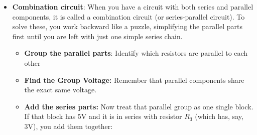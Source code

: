 \documentclass{report}
\begin{document}
\begin{itemize}
            \begin{itemize}
                \item \textbf{Identical Current (I):} The current flowing through every single series component is exactly the same (\(I_{total} = I_1 = I_2 = I_3\)). There are no alternate routes or branches, so current cannot split up.
                \item \textbf{Shared Voltage (V):} The total voltage from the power source is split across the components (\(V_{total} = V_1 + V_2 + V_3\)). Components with higher resistance will take a larger share of the voltage.
                \item \textbf{Cumulative Resistance (R):} The total resistance of the circuit is simply the sum of all individual resistances (\(R_{total} = R_1 + R_2 + R_3\)). Adding more resistors in series increases the total resistance and decreases the overall current.Dependent Operation: Because there is only one path, if any single component burns out, breaks, or is disconnected, the entire circuit is broken and all components stop working. (This is why one broken bulb on an old string of Christmas lights turns off the whole strand).
                \item \textbf{Dependent Operation:} Because there is only one path, if any single component burns out, breaks, or is disconnected, the entire circuit is broken and all components stop working. (This is why one broken bulb on an old string of Christmas lights turns off the whole strand).
            \end{itemize}
        \item \textbf{Combination circuit}: When you have a circuit with both series and parallel components, it is called a combination circuit (or series-parallel circuit).
            \bigbreak \noindent 
            To solve these, you work backward like a puzzle, simplifying the parallel parts first until you are left with just one simple series chain.
            \begin{itemize}
                \item \textbf{Group the parallel parts}: Identify which resistors are parallel to each other
                \item \textbf{Find the Group Voltage:} Remember that parallel components share the exact same voltage.
                \item \textbf{Add the series parts:} Now treat that parallel group as one single block. If that block has \(5\text{V}\) and it is in series with resistor \(R_{3}\) (which has, say, \(3\text{V}\)), you add them together:

\end{itemize}
\end{itemize}
\end{document}

